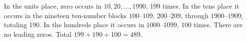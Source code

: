 In the units place, zero occurs in $10,20,\ldots,1990$, 199 times. In the tens place it occurs in the nineteen ten-number blocks $100$--$109$, $200$--$209$, through $1900$--$1909$, totaling 190. In the hundreds place it occurs in $1000$--$1099$, 100 times. There are no leading zeros. Total $199+190+100=\boxed{489}$.
